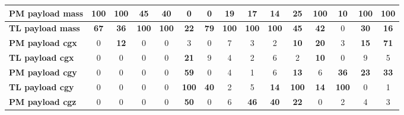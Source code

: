 \begin{table}[H]
\begin{tabular}{|l|c|c|c|c|c|c|c|c|c|c|c|c|c|c|}
    \hline
\textcolor[rgb]{0.851, 0.373, 0.008}{\textbf{PM payload mass}} & \textcolor[rgb]{0.835, 0.369, 0.000}{\textbf{100}} & \textcolor[rgb]{0.835, 0.369, 0.000}{\textbf{100}} & \textcolor[rgb]{0.000, 0.620, 0.451}{\textbf{45}} & \textcolor[rgb]{0.000, 0.620, 0.451}{\textbf{40}} & 0 & 0 & \textbf{19} & \textbf{17} & \textbf{14} & \textcolor[rgb]{0.000, 0.620, 0.451}{\textbf{25}} & \textcolor[rgb]{0.835, 0.369, 0.000}{\textbf{100}} & \textbf{10} & \textcolor[rgb]{0.835, 0.369, 0.000}{\textbf{100}} & \textcolor[rgb]{0.835, 0.369, 0.000}{\textbf{100}} \\
\hline
\textcolor[rgb]{0.851, 0.373, 0.008}{\textbf{TL payload mass}} & \textcolor[rgb]{0.000, 0.447, 0.698}{\textbf{67}} & \textcolor[rgb]{0.000, 0.620, 0.451}{\textbf{36}} & \textcolor[rgb]{0.835, 0.369, 0.000}{\textbf{100}} & \textcolor[rgb]{0.835, 0.369, 0.000}{\textbf{100}} & \textbf{22} & \textcolor[rgb]{0.000, 0.447, 0.698}{\textbf{79}} & \textcolor[rgb]{0.835, 0.369, 0.000}{\textbf{100}} & \textcolor[rgb]{0.835, 0.369, 0.000}{\textbf{100}} & \textcolor[rgb]{0.835, 0.369, 0.000}{\textbf{100}} & \textcolor[rgb]{0.000, 0.620, 0.451}{\textbf{45}} & \textcolor[rgb]{0.000, 0.620, 0.451}{\textbf{42}} & 0 & \textcolor[rgb]{0.000, 0.620, 0.451}{\textbf{30}} & \textbf{16} \\
\hline
    \textcolor[rgb]{0.000, 0.447, 0.698}{\textbf{PM payload \gls{cgx}}} & 0 & \textbf{12} & 0 & 0 & 3 & 0 & 7 & 3 & 2 & \textbf{10} & \textbf{20} & 3 & \textbf{15} & \textcolor[rgb]{0.000, 0.447, 0.698}{\textbf{71}} \\
    \hline
    \textbf{TL payload \gls{cgx}} & 0 & 0 & 0 & 0 & \textbf{21} & 9 & 4 & 2 & 6 & 2 & \textbf{10} & 0 & 9 & 5 \\
    \hline
    \textcolor[rgb]{0.000, 0.447, 0.698}{\textbf{PM payload \gls{cgy}}} & 0 & 0 & 0 & 0 & \textcolor[rgb]{0.000, 0.447, 0.698}{\textbf{59}} & 0 & 4 & 1 & 6 & \textbf{13} & 6 & \textcolor[rgb]{0.000, 0.620, 0.451}{\textbf{36}} & \textbf{23} & \textcolor[rgb]{0.000, 0.620, 0.451}{\textbf{33}} \\
    \hline
    \textcolor[rgb]{0.851, 0.373, 0.008}{\textbf{TL payload \gls{cgy}}} & 0 & 0 & 0 & 0 & \textcolor[rgb]{0.835, 0.369, 0.000}{\textbf{100}} & \textcolor[rgb]{0.000, 0.620, 0.451}{\textbf{40}} & 2 & 5 & \textbf{14} & \textcolor[rgb]{0.835, 0.369, 0.000}{\textbf{100}} & \textbf{14} & \textcolor[rgb]{0.835, 0.369, 0.000}{\textbf{100}} & 0 & 1 \\
    \hline
    \textcolor[rgb]{0.000, 0.447, 0.698}{\textbf{PM payload \gls{cgz}}} & 0 & 0 & 0 & 0 & \textcolor[rgb]{0.000, 0.447, 0.698}{\textbf{50}} & 0 & 6 & \textcolor[rgb]{0.000, 0.620, 0.451}{\textbf{46}} & \textcolor[rgb]{0.000, 0.620, 0.451}{\textbf{40}} & \textbf{22} & 0 & 2 & 4 & 3 \\

\end{tabular}
\end{table}
